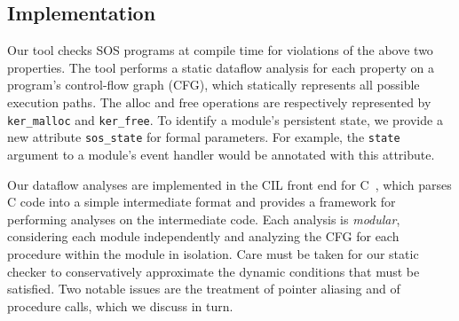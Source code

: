 %


\subsection{Implementation}

Our tool checks SOS programs at compile time for violations of the
above two properties.
The tool performs a
static dataflow analysis for each property
on a program's control-flow graph (CFG),
which statically represents all possible execution paths.  The
$\mathrm{alloc}$ and $\mathrm{free}$ operations are respectively
represented by {\tt
  ker\_malloc} and {\tt ker\_free}.  To identify a module's persistent
state, we provide a new attribute {\tt sos\_state} for formal
parameters.  For example, the {\tt state} argument to a module's event
handler would be annotated with this attribute.


Our dataflow
analyses are implemented in the CIL front end for C~\cite{CIL}, which
parses C code into a simple intermediate format and provides a
framework for performing analyses on the intermediate code.  Each
analysis is {\em modular}, considering each module independently and
analyzing the CFG for each procedure
within the module in isolation.
Care must be taken for our static checker to conservatively approximate the
dynamic conditions that must be satisfied.  Two notable issues are the
treatment of pointer aliasing and of procedure calls, which we discuss
in turn.

